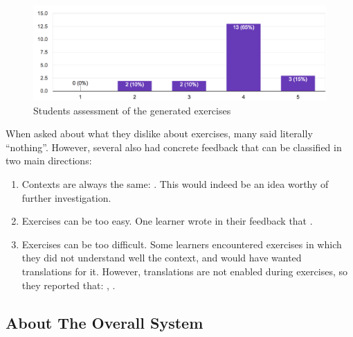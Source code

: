  \begin{figure}[h!]
    \centering
      \includegraphics[width=0.8\columnwidth]{figures/opinions/exercises_rating}
      \caption{Students assessment  of the generated exercises}
      \label{fig:ex_rating}
    \end{figure}

When asked about what they dislike about exercises, many said literally ``nothing''. However, several also had concrete feedback that can be classified in two main directions: 

\begin{enumerate}

  \item Contexts are always the same: . This would indeed be an idea worthy of further investigation.

	\item Exercises can be too easy. One learner wrote in their feedback that . 

  \item Exercises can be too difficult. Some learners encountered exercises in which they did not understand well the context, and would have wanted translations for it. However, translations are not enabled during exercises, so they reported that: , . 
	
\end{enumerate}

\subsection{About The Overall System}

